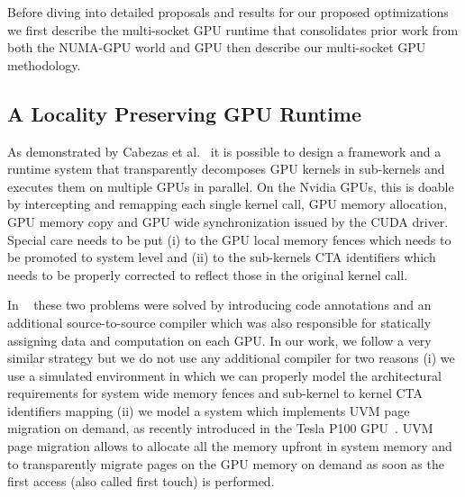 Before diving into detailed proposals and results for our proposed
optimizations we first describe the multi-socket GPU runtime that consolidates
prior work from both the NUMA-GPU world and GPU then describe our multi-socket
GPU methodology.


\subsection{A Locality Preserving GPU Runtime}
As demonstrated by Cabezas et al.~\cite{Cabezas2015} it is possible 
to design a framework and a runtime system that transparently decomposes GPU 
kernels in sub-kernels and executes them on multiple GPUs in parallel. On the 
Nvidia GPUs, this is doable by intercepting and remapping each single kernel 
call, GPU memory allocation, GPU memory copy and GPU wide synchronization issued 
by the CUDA driver. Special care needs to be put (i) to the GPU local memory 
fences which needs to be promoted to system level and (ii) to the 
sub-kernels CTA identifiers which needs to be properly corrected to 
reflect those in the original kernel call. 
 
In ~\cite{Cabezas2015} these two problems were solved by introducing  
code annotations and an additional source-to-source compiler which was also 
responsible for statically assigning data and computation on each GPU. In our 
work, we follow a very similar strategy but we do not use any additional 
compiler for two reasons (i) we use a simulated environment in which 
we can properly model the architectural requirements for system wide memory 
fences and sub-kernel to kernel CTA identifiers mapping (ii) we model a system 
which implements UVM page migration on demand, as recently introduced in the 
Tesla P100 GPU~\cite{P100}. UVM page migration allows to allocate 
all the memory upfront in system memory and to transparently migrate pages 
on the GPU memory on demand as soon as the first access (also called first 
touch) is performed.

